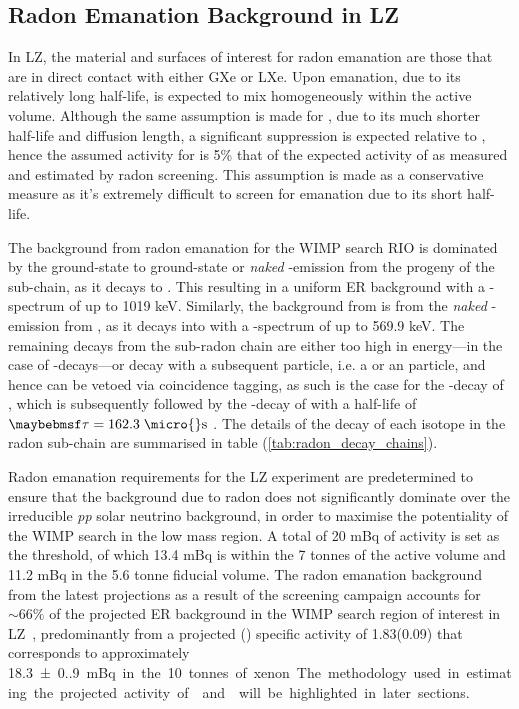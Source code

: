 \subsection{Radon Emanation Background in LZ}
\label{secsec:radon_in_lz}

In LZ, the material and surfaces of interest for radon emanation are those that are in direct contact with either GXe or LXe. Upon emanation, due to its relatively long half-life, \RnTTT{} is expected to mix homogeneously within the active volume. Although the same assumption is made for \RnTTZ{}, due to its much shorter half-life and diffusion length, a significant suppression is expected relative to \RnTTT{}, hence the assumed activity for \RnTTZ{} is 5\% that of the expected activity of \RnTTT{} as measured and estimated by radon screening. This assumption is made as a conservative measure as it's extremely difficult to screen for \RnTTZ{} emanation due to its short half-life.

The background from radon emanation for the WIMP search RIO is dominated by the ground-state to ground-state or \textit{naked} \beta-emission from the \PbTOF{} progeny of the \RnTTT{} sub-chain, as it decays to \BiTOF. This resulting in a uniform ER background with a \beta-spectrum of up to 1019 keV. Similarly, the background from \RnTTZ{} is from the \textit{naked} \beta-emission from \PbTOT{}, as it decays into \BiTOT{} with a \beta-spectrum of up to 569.9 keV. The remaining decays from the sub-radon chain are either too high in energy---in the case of \alpha-decays---or decay with a subsequent particle, i.e. a \gray{} or an \alpha particle, and hence can be vetoed via coincidence tagging, as such is the case for the \beta-decay of \BiTOF{}, which is subsequently followed by the \alpha-decay of \PbTOF{} with a half-life of $\tau{} = 162.3 \; \MathText{\micro{}s}$ \cite{radiogenic_muon_lux,Araujo:2011as}. The details of the decay of each isotope in the radon sub-chain are summarised in table (\ref{tab:radon_decay_chains}).

Radon emanation requirements for the LZ experiment are predetermined to ensure that the background due to radon does not significantly dominate over the irreducible \textit{pp} solar neutrino background, in order to maximise the potentiality of the WIMP search in the low mass region. A total of 20 mBq of \RnTTT{} activity is set as the threshold, of which 13.4 mBq is within the 7 tonnes of the active volume and 11.2 mBq in the 5.6 tonne fiducial volume. The radon emanation background from the latest projections as a result of the screening campaign accounts for $\sim66\%$ of the projected ER background in the WIMP search region of interest in LZ~\cite{akerib2018projected}, predominantly from a projected \RnTTT{}(\RnTTZ{}) specific activity of 1.83(0.09) {\micro\becquerel\per\kilogram} that corresponds to approximately \SI{18.3(0.9)} mBq in the 10 tonnes of xenon. The methodology used in estimating the projected activity of \RnTTT{} and \RnTTZ{} will be highlighted in later sections. 

